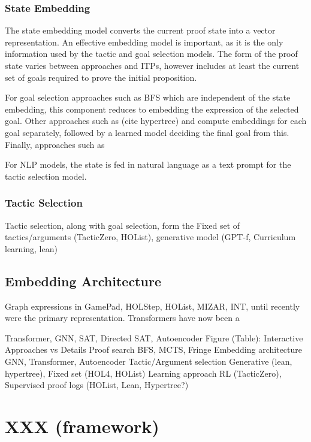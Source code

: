 \documentclass[letterpaper]{article} %
\begin{document}
    \subsubsection{State Embedding}
    The state embedding model converts the current proof state into a vector representation.
    An effective embedding model is important, as it is the only information used by the tactic and goal selection models.
    The form of the proof state varies between approaches and ITPs,
    however includes at least the current set of goals required to prove the initial proposition.

    For goal selection approaches such as BFS which are independent of the state embedding,
    this component reduces to embedding the expression of the selected goal.
    Other approaches such as (cite hypertree) and \cite{wu_tacticzero_2021} compute embeddings for each goal separately,
    followed by a learned model deciding the final goal from this.
    Finally, approaches such as


    For NLP models, the state is fed in natural language as a text prompt for the tactic selection model.

    \subsubsection{Tactic Selection}
    Tactic selection, along with goal selection, form the
    Fixed set of tactics/arguments (TacticZero, HOList), generative model (GPT-f, Curriculum learning, lean)

    \subsection{Embedding Architecture}

    Graph expressions in GamePad, HOLStep, HOList, MIZAR, INT, until recently were the primary representation.
    Transformers have now been a

    Transformer, GNN, SAT, Directed SAT, Autoencoder
    Figure (Table):
    Interactive Approaches vs Details
    Proof search
    BFS, MCTS, Fringe
    Embedding architecture
    GNN, Transformer, Autoencoder
    Tactic/Argument selection
    Generative (lean, hypertree), Fixed set (HOL4, HOList)
    Learning approach
    RL (TacticZero), Supervised proof logs (HOList, Lean, Hypertree?)


    \section{XXX (framework)}
\end{document}
